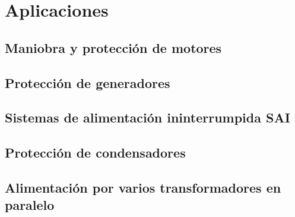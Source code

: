 \chapter{Aplicaciones}
\section{Maniobra y protección de motores}
\section{Protección de generadores}
\section{Sistemas de alimentación ininterrumpida SAI}
\section{Protección de condensadores}
\section{Alimentación por varios transformadores en paralelo}